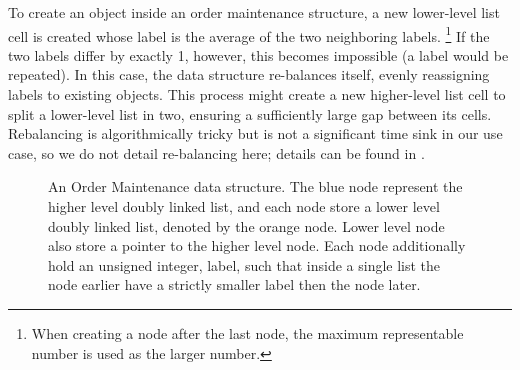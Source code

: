 To create an object inside an order maintenance structure,
  a new lower-level list cell is created
  whose label is the average of the two neighboring labels.%
\footnote{
  When creating a node after the last node,
  the maximum representable number is used as the larger number.
}
If the two labels differ by exactly 1, however,
  this becomes impossible (a label would be repeated).
In this case, the data structure re-balances itself,
  evenly reassigning labels to existing objects.
This process might
  create a new higher-level list cell
  to split a lower-level list in two,
  ensuring a sufficiently large gap between its cells.
Rebalancing is algorithmically tricky
  but is not a significant time sink in our use case,
  so we do not detail re-balancing here;
  details can be found in \citet{SOM}.

\begin{figure}
\caption{An Order Maintenance data structure. The blue node represent the higher level doubly linked list, and each node store a lower level doubly linked list, denoted by the orange node. Lower level node also store a pointer to the higher level node. Each node additionally hold an unsigned integer, label, such that inside a single list the node earlier have a strictly smaller label then the node later.}
\label{fig:om}
\end{figure}

